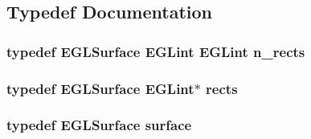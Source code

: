 \subsection{Typedef Documentation}
\hypertarget{simple-egl_8cpp_aa6a11810244355f89e6c4961b9dd3b53}{
\subsubsection[{n\-\_\-rects}]{\setlength{\rightskip}{0pt plus 5cm}typedef E\-G\-L\-Surface E\-G\-Lint E\-G\-Lint {\bf n\-\_\-rects}}}\label{simple-egl_8cpp_aa6a11810244355f89e6c4961b9dd3b53}
\hypertarget{simple-egl_8cpp_a56616f7ca3fc53c0da41d05de9330b11}{
\subsubsection[{rects}]{\setlength{\rightskip}{0pt plus 5cm}typedef E\-G\-L\-Surface E\-G\-Lint$\ast$ {\bf rects}}}\label{simple-egl_8cpp_a56616f7ca3fc53c0da41d05de9330b11}
\hypertarget{simple-egl_8cpp_a0720952aa1caded45b5bcdce589663a9}{
\subsubsection[{surface}]{\setlength{\rightskip}{0pt plus 5cm}typedef E\-G\-L\-Surface {\bf surface}}}\label{simple-egl_8cpp_a0720952aa1caded45b5bcdce589663a9}


